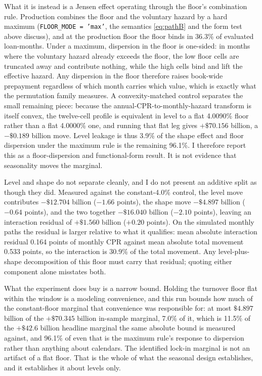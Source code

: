 \documentclass[12pt]{article}
\begin{document}
What it is instead is a Jensen effect operating through the floor's combination rule. Production combines the floor and the voluntary hazard by a hard maximum (\texttt{FLOOR\_MODE = 'max'}, the semantics \eqref{eq:pathB} and the form test above discuss), and at the production floor the floor binds in 36.3\% of evaluated loan-months. Under a maximum, dispersion in the floor is one-sided: in months where the voluntary hazard already exceeds the floor, the low floor cells are truncated away and contribute nothing, while the high cells bind and lift the effective hazard. Any dispersion in the floor therefore raises book-wide prepayment regardless of which month carries which value, which is exactly what the permutation family measures. A convexity-matched control separates the small remaining piece: because the annual-CPR-to-monthly-hazard transform is itself convex, the twelve-cell profile is equivalent in level to a flat 4.0090\% floor rather than a flat 4.0000\% one, and running that flat leg gives $+\$70.156$ billion, a $-\$0.189$ billion move. Level leakage is thus 3.9\% of the shape effect and floor dispersion under the maximum rule is the remaining 96.1\%. I therefore report this as a floor-dispersion and functional-form result. It is not evidence that seasonality moves the marginal.

Level and shape do not separate cleanly, and I do not present an additive split as though they did. Measured against the constant-4.0\% control, the level move contributes $-\$12.704$ billion ($-1.66$ points), the shape move $-\$4.897$ billion ($-0.64$ points), and the two together $-\$16.040$ billion ($-2.10$ points), leaving an interaction residual of $+\$1.560$ billion ($+0.20$ points). On the simulated monthly paths the residual is larger relative to what it qualifies: mean absolute interaction residual 0.164 points of monthly CPR against mean absolute total movement 0.533 points, so the interaction is 30.9\% of the total movement. Any level-plus-shape decomposition of this floor must carry that residual; quoting either component alone misstates both.

What the experiment does buy is a narrow bound. Holding the turnover floor flat within the window is a modeling convenience, and this run bounds how much of the constant-floor marginal that convenience was responsible for: at most $\$4.897$ billion of the $+\$70.345$ billion in-sample marginal, 7.0\% of it, which is 11.5\% of the $+\$42.6$ billion headline marginal the same absolute bound is measured against, and 96.1\% of even that is the maximum rule's response to dispersion rather than anything about calendars. The identified lock-in marginal is not an artifact of a flat floor. That is the whole of what the seasonal design establishes, and it establishes it about levels only.
\end{document}

